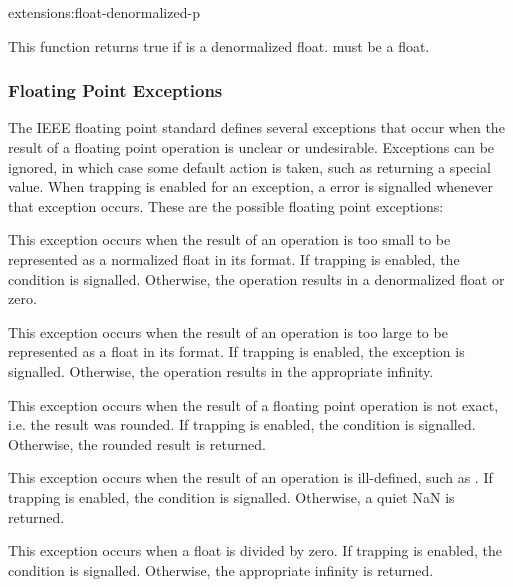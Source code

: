 \begin{defun}{extensions:}{float-denormalized-p}{}
  
  This function returns true if  is a denormalized float.
   must be a float.
\end{defun}


\subsubsection{Floating Point Exceptions}
\label{float-traps}

The IEEE floating point standard defines several exceptions that occur
when the result of a floating point operation is unclear or
undesirable.  Exceptions can be ignored, in which case some default
action is taken, such as returning a special value.  When trapping is
enabled for an exception, a error is signalled whenever that exception
occurs.  These are the possible floating point exceptions:
\begin{Lentry}
  
\item[\kwd{underflow}] This exception occurs when the result of an
  operation is too small to be represented as a normalized float in
  its format.  If trapping is enabled, the
   condition is signalled.
  Otherwise, the operation results in a denormalized float or zero.
  
\item[\kwd{overflow}] This exception occurs when the result of an
  operation is too large to be represented as a float in its format.
  If trapping is enabled, the 
  exception is signalled.  Otherwise, the operation results in the
  appropriate infinity.
  
\item[\kwd{inexact}] This exception occurs when the result of a
  floating point operation is not exact, i.e. the result was rounded.
  If trapping is enabled, the 
  condition is signalled.  Otherwise, the rounded result is returned.
  
\item[\kwd{invalid}] This exception occurs when the result of an
  operation is ill-defined, such as .  If
  trapping is enabled, the 
  condition is signalled.  Otherwise, a quiet NaN is returned.
  
\item[\kwd{divide-by-zero}] This exception occurs when a float is
  divided by zero.  If trapping is enabled, the
   condition is signalled.  Otherwise, the
  appropriate infinity is returned.
\end{Lentry}

